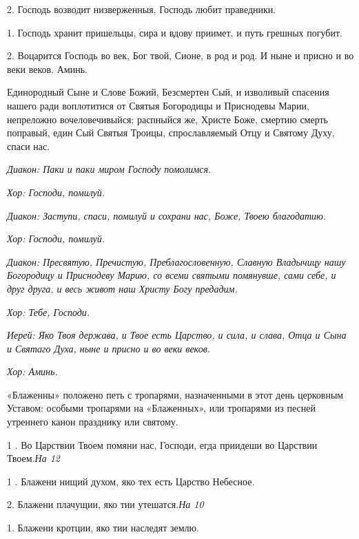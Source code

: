 2. Господь возводит низверженныя, Господь любит праведники. 


1. Господь хранит пришельцы, сира и вдову приимет, и путь грешных погубит. 


2. Воцарится Господь во век, Бог твой, Сионе, в род и род. И ныне и присно и во веки веков. Аминь. 




Единородный Сыне и Слове Божий, Безсмертен Сый, и изволивый спасения нашего ради воплотитися от Святыя Богородицы и Приснодевы Марии, непреложно вочеловечивыйся; распныйся же, Христе Боже, смертию смерть поправый, един Сый Святыя Троицы, спрославляемый Отцу и Святому Духу, спаси нас. 




\itshape Диакон:\normalfont{} Паки и паки миром Господу помолимся. 


\itshape Хор:\normalfont{} Господи, помилуй. 


\itshape Диакон:\normalfont{} Заступи, спаси, помилуй и сохрани нас, Боже, Твоею благодатию. 


\itshape Хор:\normalfont{} Господи, помилуй. 


\itshape Диакон:\normalfont{} Пресвятую, Пречистую, Преблагословенную, Славную Владычицу нашу Богородицу и Приснодеву Марию, со всеми святыми помянувше, сами себе, и друг друга, и весь живот наш Христу Богу предадим.


\itshape Хор:\normalfont{} Тебе, Господи. 


\itshape Иерей:\normalfont{} Яко Твоя держава, и Твое есть Царство, и сила, и слава, Отца и Сына и Святаго Духа, ныне и присно и во веки веков. 


\itshape Хор:\normalfont{} Аминь.




«Блаженны» положено петь с тропарями, назначенными в этот день церковным Уставом: особыми тропарями на «Блаженных», или тропарями из песней утреннего канон празднику или святому.


1 . Во Царствии Твоем помяни нас, Господи, егда приидеши во Царствии Твоем.\itshape  На \normalfont{}12 


1 . Блажени нищий духом, яко тех есть Царство Небесное. 


2. Блажени плачущии, яко тии утешатся.\itshape  На \normalfont{}10 


1. Блажени кротции, яко тии наследят землю. 


